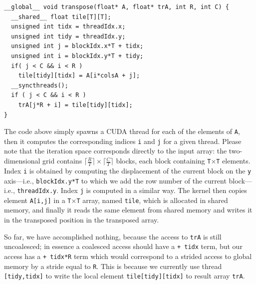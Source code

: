 \documentclass[acmsmall,review]{acmart}\settopmatter{printfolios=true,printccs=false,printacmref=false}
\begin{document}
\begin{lstlisting}[mathescape=true]
__global__ void transpose(float* A, float* trA, int R, int C) {
  __shared__ float tile[T][T];
  unsigned int tidx = threadIdx.x;
  unsigned int tidy = threadIdx.y;
  unsigned int j = blockIdx.x*T + tidx;
  unsigned int i = blockIdx.y*T + tidy;
  if( j < C && i < R )
    tile[tidy][tidx] = A[i*colsA + j];
  __syncthreads();
  if ( j < C && i < R )
    trA[j*R + i] = tile[tidy][tidx];
}
\end{lstlisting}\vspace{-2ex}
The code above simply spawns a CUDA thread for each of the elements of {\tt A},
then it computes the corresponding indices {\tt i} and {\tt j} for a given thread.
Please note that the iteration space corresponds directly to the input array:
the two-dimensional grid contains $\lceil\frac{R}{T}\rceil\times\lceil\frac{C}{T}\rceil$ 
blocks, each block containing {\tt T$\times$T} elements.
Index {\tt i} is obtained by computing the displacement of the current block
on the {\tt y} axis---i.e., {\tt blockIdx.y*T} to which we add the row number
of the current block---i.e., {\tt threadIdx.y}. Index {\tt j} is computed in a similar way.
The kernel then copies element {\tt A[i,j]} in a {\tt T$\times$T} array, named 
{\tt tile}, which is allocated in shared memory, and finally it reads the same 
element from shared memory and writes it in the transposed position in the 
transposed array. 

So far, we have accomplished nothing, because the access to {\tt trA} is
still uncoalesced; in essence a coalesced access should have a {\tt + tidx} term,
but our access has a {\tt + tidx*R} term which would correspond to a strided 
access to global memory by a stride equal to {\tt R}. This is because we currently
use thread {\tt [tidy,tidx]} to write the local element {\tt tile[tidy][tidx]}
to result array {\tt trA}. 

\enlargethispage{\baselineskip}
\end{document}
